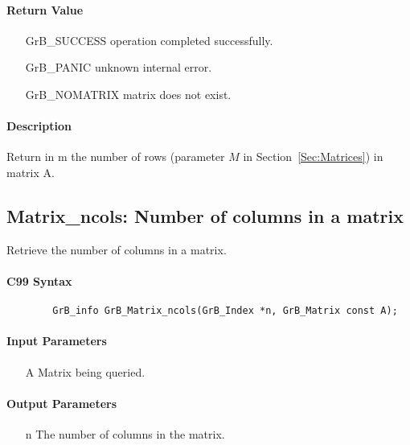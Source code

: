 \paragraph{Return Value}

\begin{itemize}[leftmargin=2.1in]
\item[{\sf GrB\_SUCCESS}]   operation completed successfully.
\item[{\sf GrB\_PANIC}]     unknown internal error.
\item[{\sf GrB\_NOMATRIX}]  matrix does not exist.
\end{itemize}

\paragraph{Description}

Return in {\sf m} the number of rows (parameter $M$ in Section~\ref{Sec:Matrices}) in matrix {\sf A}.

\subsection{{\sf Matrix\_ncols}: Number of columns in a matrix}

Retrieve the number of columns in a matrix.

\paragraph{C99 Syntax}

\begin{verbatim}
        GrB_info GrB_Matrix_ncols(GrB_Index *n, GrB_Matrix const A);
\end{verbatim}

\paragraph{Input Parameters}

\begin{itemize}[leftmargin=1.1in]
    \item[{\sf A}] Matrix being queried.
\end{itemize}

\paragraph{Output Parameters}
\begin{itemize}[leftmargin=1.1in]
    \item[{\sf n}] The number of columns in the matrix.
\end{itemize}

